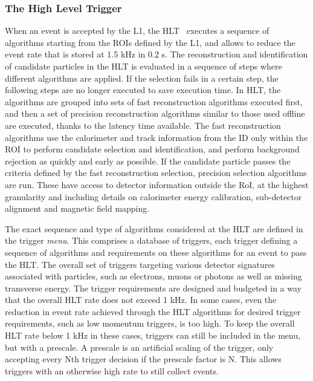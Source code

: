 \subsubsection{The High Level Trigger}


When an event is accepted by the \ac{L1}, the \ac{HLT}~\cite{ATLASHLTTrigger} executes a sequence of algorithms starting from the \acp{ROI} defined by the \ac{L1}, and allows to reduce the event rate that is stored at 1.5 kHz in 0.2 s. 
The reconstruction and identification of candidate particles in the \ac{HLT} is evaluated in a sequence of steps where different algorithms are applied. 
If the selection fails in a certain step, the following steps are no longer executed to save execution time. 
In \ac{HLT}, the algorithms are grouped into sets of fast reconstruction algorithms executed first, and then a set of precision reconstruction algorithms similar to those used offline are executed, thanks to the latency time available.
The fast reconstruction algorithms use the calorimeter and track information from the \ac{ID} only within the \ac{ROI} to perform candidate selection and identification, and perform background rejection as quickly and early as possible.
If the candidate particle passes the criteria defined by the fast reconstruction selection, precision selection algorithms are run. These have access to detector information outside the RoI, at the highest granularity and including details on calorimeter energy calibration, sub-detector alignment and magnetic field mapping.

The exact sequence and type of algorithms considered at the \ac{HLT} are defined in the trigger \textit{menu}. This comprises a database of triggers, each trigger defining a sequence of algorithms and requirements on these algorithms for an event to pass the \ac{HLT}. The overall set of triggers targeting various detector signatures associated with particles, such as electrons, muons or photons as well as missing transverse energy. The trigger requirements are designed and budgeted in a way that the overall \ac{HLT} rate does not exceed 1 kHz. In some cases, even the reduction in event rate achieved through the \ac{HLT} algorithms for desired trigger requirements, such as low momentum triggers, is too high. To keep the overall \ac{HLT} rate below 1 kHz in these cases, triggers can still be included in the menu, but with a prescale. A prescale is an artificial scaling of the trigger, only accepting every Nth trigger decision if the prescale factor is N. This allows triggers with an otherwise high rate to still collect events.

